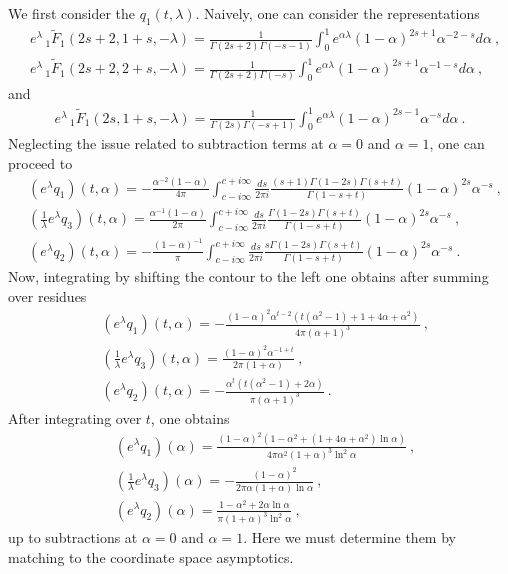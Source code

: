 \documentclass[a4paper,11pt]{article}
\begin{document}
We first consider the $q_1(t,\lambda)$. Naively, one can consider the representations
\begin{align}
&e^{\lambda}\,_1\tilde F_1(2s+2,1+s,-\lambda)=\frac{1}{\Gamma(2s+2)\Gamma(-s-1)}\int_{0}^1 e^{\alpha \lambda}(1-\alpha)^{2s+1}\alpha^{-2-s} d\alpha \ , \\ 
&e^{\lambda}\,_1\tilde F_1(2s+2,2+s,-\lambda)=\frac{1}{\Gamma(2s+2)\Gamma(-s)}\int_{0}^1 e^{\alpha \lambda}(1-\alpha)^{2s+1}\alpha^{-1-s} d\alpha \ ,
\end{align}
and 
\begin{align}
e^{\lambda}\,_1\tilde F_1(2s,1+s,-\lambda)=\frac{1}{\Gamma(2s)\Gamma(-s+1)}\int_{0}^1 e^{\alpha \lambda }(1-\alpha)^{2s-1}\alpha^{-s}d\alpha \ .
\end{align}
Neglecting the issue related to subtraction terms at $\alpha=0$ and $\alpha=1$, one can proceed to
\begin{align}
& (e^{\lambda}q_1)(t,\alpha)=-\frac{\alpha^{-2}(1-\alpha)}{4\pi}\int_{c-i\infty}^{c+i\infty} \frac{ds}{2\pi i}\frac{(s+1)\Gamma(1-2s)\Gamma(s+t)}{\Gamma(1-s+t)}(1-\alpha)^{2s}\alpha^{-s} \ , \\ 
& \left(\frac{1}{\lambda}e^{\lambda}q_3\right)(t,\alpha)=\frac{\alpha^{-1}(1-\alpha)}{2\pi}\int_{c-i\infty}^{c+i\infty} \frac{ds}{2\pi i}\frac{\Gamma(1-2s)\Gamma(s+t)}{\Gamma(1-s+t)}(1-\alpha)^{2s}\alpha^{-s} \ , \\ 
&(e^{\lambda}q_2)(t,\alpha)=-\frac{(1-\alpha)^{-1}}{\pi}\int_{c-i\infty}^{c+i\infty} \frac{ds}{2\pi i}\frac{s\Gamma(1-2s)\Gamma(s+t)}{\Gamma(1-s+t)}(1-\alpha)^{2s}\alpha^{-s} \ .
\end{align}
Now, integrating by shifting the contour to the left one obtains after summing over residues
\begin{align}
&(e^{\lambda}q_1)(t,\alpha)=-\frac{(1-\alpha)^2 \alpha^{t-2} \left(t (\alpha^2-1)+1+4\alpha+\alpha^2\right)}{4\pi(\alpha+1)^3} \ , \\
&\left(\frac{1}{\lambda}e^{\lambda}q_3\right)(t,\alpha)=\frac{(1-\alpha)^2\alpha^{-1+t}}{2\pi(1+\alpha)} \ , \\ 
&(e^{\lambda}q_2)(t,\alpha)=-\frac{\alpha^t(t(\alpha^2-1)+2\alpha)}{\pi(\alpha+1)^3} \ .
\end{align}
After integrating over $t$, one obtains
\begin{align}
&(e^{\lambda}q_1)(\alpha)=\frac{(1-\alpha)^2 \left(1-\alpha^2+(1+4\alpha+\alpha^2)\ln \alpha\right)}{4\pi \alpha^2 (1+\alpha)^3 \ln ^2\alpha} \ , \\ 
&\left(\frac{1}{\lambda}e^{\lambda}q_3\right)(\alpha)=-\frac{(1-\alpha)^2}{2\pi \alpha(1+\alpha)\ln \alpha} \ , \\ 
&(e^{\lambda}q_2)(\alpha)=\frac{1-\alpha^2+2\alpha \ln \alpha}{\pi (1+\alpha)^3\ln^2 \alpha} \ ,
\end{align}
up to subtractions at $\alpha=0$ and $\alpha=1$. Here we must determine them by matching to the coordinate space asymptotics.
\end{document}
